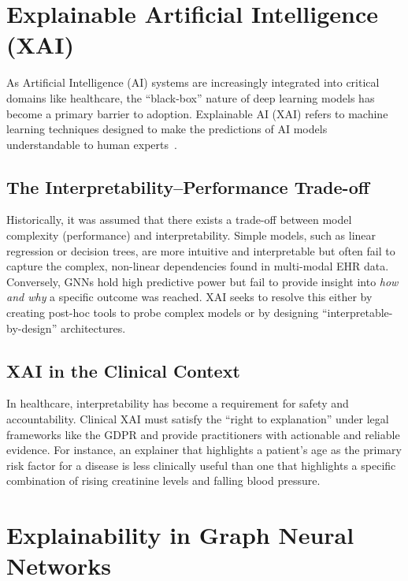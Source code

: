 \section{Explainable Artificial Intelligence (XAI)}
\label{sec:what-is-xai}

As Artificial Intelligence (AI) systems are increasingly integrated into
critical domains like healthcare, the ``black-box'' nature of deep learning
models has become a primary barrier to adoption. Explainable AI (XAI) refers to
machine learning techniques designed to make the predictions of AI models
understandable to human experts~\cite{yuan2022explainability}.

\subsection{The Interpretability--Performance Trade-off}\label{sec:tradeoff}

Historically, it was assumed that there exists a trade-off between model
complexity (performance) and interpretability. Simple models, such as linear
regression or decision trees, are more intuitive and interpretable but often
fail to capture the complex, non-linear dependencies found in multi-modal EHR
data. Conversely, GNNs hold high predictive power but fail to provide insight
into \emph{how and why} a specific outcome was reached. XAI seeks to resolve
this either by creating post-hoc tools to probe complex models or by designing
``interpretable-by-design'' architectures.

\subsection{XAI in the Clinical Context}

In healthcare, interpretability has become a requirement for safety and
accountability. Clinical XAI must satisfy the ``right to explanation'' under
legal frameworks like the GDPR and provide practitioners with actionable and
reliable evidence. For instance, an explainer that highlights a patient's age
as the primary risk factor for a disease is less clinically useful than one
that highlights a specific combination of rising creatinine levels and falling
blood pressure.

\section{Explainability in Graph Neural Networks}
\label{sec:xai-gnn}

